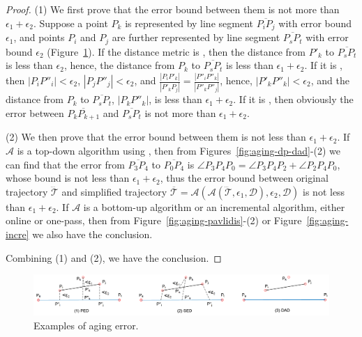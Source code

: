 \begin{proof} 	
	(1) We first prove that the error bound between them is not more than $\epsilon_1+ \epsilon_2$. Suppose a point $P_k$ is represented by line segment $\overline{P_iP_j}$ with error bound $\epsilon_1$, and points $P_i$ and $P_j$ are further represented by line segment $\overline{P_sP_t}$ with error bound $\epsilon_2$ (Figure~\ref{fig:aging-error}).
	If the distance metric is \ped, then the distance from $P'_k$ to $\overline{P_sP_t}$ is less than $\epsilon_2$, hence, the distance from $P_k$ to $\overline{P_sP_t}$ is less than $\epsilon_1 + \epsilon_2$.
	If it is \sed, then $|P_iP''_i|<\epsilon_2$, $|P_jP''_j|<\epsilon_2$, and $\frac{|P_iP'_k|}{|P'_kP_j|} = \frac{|P''_iP''_k|}{|P''_kP''_j|}$, hence, $|P'_kP''_k|<\epsilon_2$, and the distance from $P_k$ to $\overline{P_sP_t}$, \ie $|P_kP''_k|$, is less than $\epsilon_1 + \epsilon_2$.
	If it is \dad, then obviously the error between $\overline{P_kP_{k+1}}$ and $\overline{P_sP_t}$ is not more than $\epsilon_1+ \epsilon_2$.
	
	(2) We then prove that the  error bound between them is not less than $\epsilon_1+ \epsilon_2$.
	If $\mathcal{A}$ is a top-down algorithm using \dad, then from Figures~\ref{fig:aging-dp-dad}-(2) we can find that the error from $\overline{P_3P_4}$ to $\overline{P_0P_4}$ is $\angle{P_3P_4P_0} = \angle{P_3P_4P_2} + \angle{P_2P_4P_0}$, whose bound is not less than $\epsilon_1 + \epsilon_2$, thus the error bound between original trajectory $\dddot{\mathcal{T}}$ and simplified trajectory $\overline{\mathcal{T}}=\mathcal{A}(\mathcal{A}(\dddot{\mathcal{T}}, \epsilon_1, \mathcal{D}), \epsilon_2, \mathcal{D})$ is not less than $\epsilon_1+ \epsilon_2$.
	If $\mathcal{A}$ is a bottom-up algorithm or an incremental algorithm, either online or one-pass, then from Figure~\ref{fig:aging-pavlidis}-(2) or Figure~\ref{fig:aging-incre} we also have the conclusion.
	
	
	Combining (1) and (2), we have the conclusion.
\end{proof}

\begin{figure}[tb!]
	\centering
	\includegraphics[scale=0.6]{Figures/Fig-aging-error.png}
	
	\caption{\small Examples of aging error.}
	\vspace{-2ex}
	\label{fig:aging-error}
\end{figure}